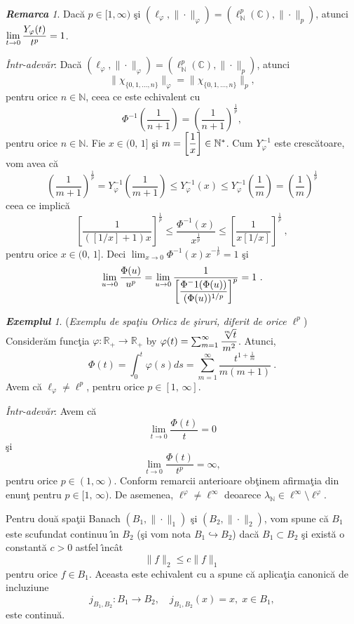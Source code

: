 \documentclass[ a4paper, 12pt]{report}
\newcommand{\C}{\mathbb{C}}
\newcommand{\R}{\mathbb{R}}
\newcommand{\N}{\mathbb{N}}
\theoremstyle{definition}
\theoremstyle{remark}
\newtheorem{remarc}{\bf Remarca}[section]
\newtheorem{exemple}{\bf Exemplul}[section]
\numberwithin{equation}{section}
\begin{document}
\begin{remarc}
Dac\u a $p\in[1,\infty)$ \c si $(\ell_{\varphi},\|\cdot\|_{\varphi})=(\ell^p_{\N}(\C),\|\cdot\|_p)$, atunci $\lim\limits_{t\to 0}\displaystyle\frac{Y_\varphi(t)}{t^p}=1$.

{\it \^ Intr-adev\u ar}: Dac\u a  $(\ell_{\varphi},\|\cdot\|_{\varphi})=(\ell^p_{\N}(\C),\|\cdot\|_p)$, atunci $$\|\chi_{\{0,1,...,n\}}\|_{\varphi}=\|\chi_{\{0,1,...,n\}}\|_{p},$$ pentru orice $n\in\N$, ceea ce este echivalent cu
$$\Phi^{-1}\left(\frac{1}{n+1}\right)=\left(\frac{1}{n+1}\right)^{\frac{1}{p}},$$ pentru orice $n\in\N$.
Fie $x \in (0,\, 1]$ \c si $m=\left[\ds\frac{1}{x}\right]\in\N^*$. Cum $Y_\varphi^{-1}$ este cresc\u atoare, vom avea c\u a
$$\left(\frac{1}{m+1}\right)^{\frac{1}{p}} = Y_\varphi^{-1}\left(\frac{1}{m+1}\right) \leq
 Y_\varphi^{-1}(x) \leq Y_\varphi^{-1}\left(\frac{1}{m}\right) = \left(\frac{1}{m} \right)^{\frac{1}{p}} $$
ceea ce implic\u a
$$\left[\frac{1}{([1/x]+1)x} \right]^{\frac{1}{p}}\leq \frac{\Phi^{-1}(x)}{x^{\frac{1}{p}}} \leq
 \left[\frac{1}{x[1/x]} \right]^{\frac{1}{p}} \ ,$$
pentru orice $x \in (0,\, 1]$. Deci $\lim_{x\to0}\Phi^{-1}(x) x^{-\frac{1}{p}} =1$ \c si
$$\lim_{u\to0}\frac{\Phi(u)}{u^p} = \lim_{u\to0}\frac{1}{\left[\displaystyle\frac{\Phi^-1(\Phi(u))}{(\Phi(u))^{1/p}} \right]^p}  = 1\ .$$
\end{remarc}

\begin{exemple}({\it Exemplu de spa\c tiu Orlicz de \c siruri, diferit de orice $\ell^p$})
\label{exOrlicznotlp}
Consider\u am func\c tia $\varphi:\R_+\to \R_+$ by $\varphi(t) = \sum_{m=1}^{\infty}\displaystyle\frac{\sqrt[m]{t}}{m^2}$. Atunci,
$$  \Phi(t) = \int_{0}^t \varphi(s)ds = \sum_{m=1}^{\infty}\frac{t^{1+\frac{1}{m}}}{m(m+1)}\ . $$
Avem c\u a $\ell_{\varphi}\neq\ell^p$, pentru orice $p\in[1,\, \infty]$.
\end{exemple}

{\it \^ Intr-adev\u ar}: Avem c\u a
$$\lim\limits_{t\to0}\frac{\Phi(t)}{t}=0$$ \c si
$$\lim\limits_{t\to0}\frac{\Phi(t)}{t^p}=\infty,$$ pentru orice $p\in(1,\infty)$. Conform remarcii anterioare ob\c tinem afirma\c tia din enun\c t pentru $p \in [1, \, \infty)$. De asemenea, $\ell^{\varphi}\neq\ell^{\infty}$ deoarece $\lambda_{\N}\in\ell^{\infty}\setminus\ell^{\varphi}$.

\bigskip

Pentru dou\u a spa\c tii Banach $(B_1,\|\cdot\|_1)$ \c si $(B_2,\|\cdot\|_2)$, vom spune c\u a $B_1$ este scufundat continuu
\^\i n $B_2$ (\c si vom nota $B_1\hookrightarrow B_2$)
dac\u a $B_1\subset B_2$ \c si exist\u a o constant\u a $c>0$ astfel \^\i nc\^ at
$$\|f\|_2\leq c\|f\|_1$$ pentru orice $f\in B_1$. Aceasta este echivalent cu a spune c\u a aplica\c tia canonic\u a de incluziune
$$j_{B_1,B_2} : B_1 \to B_2, \quad j_{B_1,B_2}(x)= x, \; x \in B_1,$$
este continu\u a.
\end{document}
